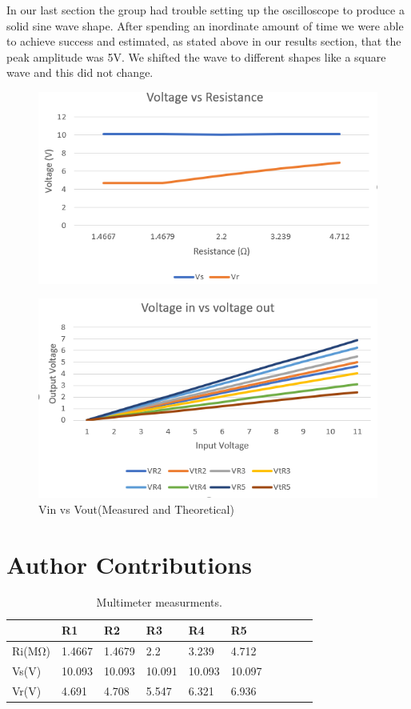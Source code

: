 \documentclass[10pt,twocolumn]{article}
\begin{document}
In our last section the group had trouble setting up the oscilloscope to produce a solid sine wave shape. After spending an inordinate amount of time we were able to achieve success and estimated, as stated above in our results section, that the peak amplitude was 5V. We shifted the wave to different shapes like a square wave and this did not change. 

\begin{figure}
	\centering
	\includegraphics[width=.9\linewidth]{figures/V vs R.PNG}
	\caption{}
	\label{fig:graph}
\end{figure}

\begin{figure}
	\centering
	\includegraphics[width=.9\linewidth]{figures/Vin vs Vout.PNG}
	\caption{Vin vs Vout(Measured and Theoretical)}
	\label{fig:vin/out}
\end{figure}

\section{Author Contributions}



 
\begin{table}
	\begin{tabularx}{1\linewidth}{ lXXXXX|cXXX }
		\hline
		 & \textbf{R1} & \textbf{R2} & \textbf{R3} & \textbf{R4} & \textbf{R5}\\
		\hline
		Ri(MΩ) & 1.4667 & 1.4679 & 2.2 & 3.239 & 4.712 \\
		\cline{1-6}
		Vs(V) & 10.093 & 10.093 & 10.091 & 10.093 & 10.097 \\
		\cline{1-6}
		Vr(V) & 4.691 & 4.708 & 5.547 & 6.321 & 6.936 \\
		\hline
	\end{tabularx}
	\caption{Multimeter measurments.}
	\label{tab:Tab1}
\end{table}
\end{document}
